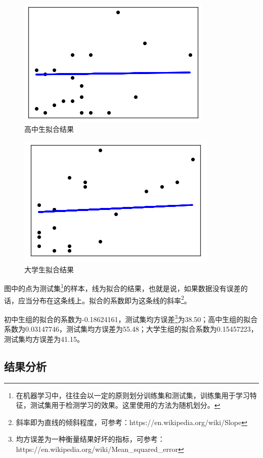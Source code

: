\documentclass[]{article}
\begin{document}
\begin{figure}
	\centering
	\includegraphics[width=0.7\linewidth]{fig/nh3}
	\caption{高中生拟合结果}
	\label{fig:nh3}
\end{figure}

\begin{figure}
	\centering
	\includegraphics[width=0.7\linewidth]{fig/nh4}
	\caption{大学生拟合结果}
	\label{fig:nh4}
\end{figure}

图中的点为测试集\footnote{在机器学习中，往往会以一定的原则划分训练集和测试集，训练集用于学习特征，测试集用于检测学习的效果。这里使用的方法为随机划分。}的样本，线为拟合的结果，也就是说，如果数据没有误差的话，应当分布在这条线上。拟合的系数即为这条线的斜率\footnote{斜率即为直线的倾斜程度，可参考：https://en.wikipedia.org/wiki/Slope}。

初中生组的拟合的系数为-0.18624161，测试集均方误差\footnote{均方误差为一种衡量结果好坏的指标，可参考：https://en.wikipedia.org/wiki/Mean\_squared\_error}为38.50；高中生组的拟合系数为0.03147746，测试集均方误差为55.48；大学生组的拟合系数为0.15457223，测试集均方误差为41.15。

\subsection{结果分析}
\end{document}
